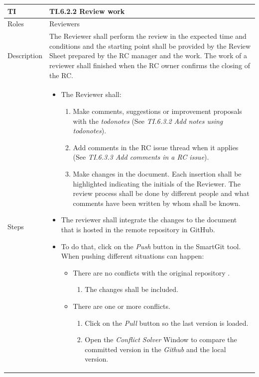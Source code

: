 \documentclass{template/openetcs_article}
\begin{document}
\begin{flushleft}
\tablefirsthead{}
\tablehead{}
\tabletail{}
\tablelasttail{}
\begin{supertabular}{|m{2cm}|m{13cm}|}
\hline
{}
TI & 
TI.6.2.2 Review work
\\\hline
Roles &
Reviewers
\\\hline
Description &
The Reviewer shall perform the review in the expected time and conditions and the starting point shall be provided by the Review Sheet prepared by the RC manager and the work. The work of a reviewer shall finished when the RC owner confirms the closing of the RC.
\\\hline
Steps &
\begin{itemize}
\item The Reviewer shall:
\begin{enumerate}
\item Make comments, suggestions or improvement proposals with the {\it todonotes} (See {\it TI.6.3.2 Add notes using todonotes}).
\item Add comments in the RC issue thread when it applies (See {\it TI.6.3.3 Add comments in a RC issue}).
\item Make changes in the document. Each insertion shall be highlighted indicating the initials of the Reviewer. The review process shall be done by different people and what comments have been written by whom shall be known.
\end{enumerate}
\item The reviewer shall integrate the changes to the document that is hosted in the remote repository in GitHub. 
\item To do that, click on the {\it Push} button in the SmartGit tool. When pushing different situations can happen:
\begin{itemize}
\item There are no conflicts with the original repository .
\begin{enumerate}
\item The changes shall be included.
\end{enumerate}
\end{itemize}
\begin{itemize}
\item There are one or more conflicts.
\begin{enumerate}
\item Click on the {\it Pull} button so the last version is loaded. 
\item Open the {\it Conflict Solver} Window to compare the committed version in the {\it Github} and the local version. 

\end{enumerate}
\end{itemize}
\end{itemize}
\end{supertabular}
\end{flushleft}
\end{document}
